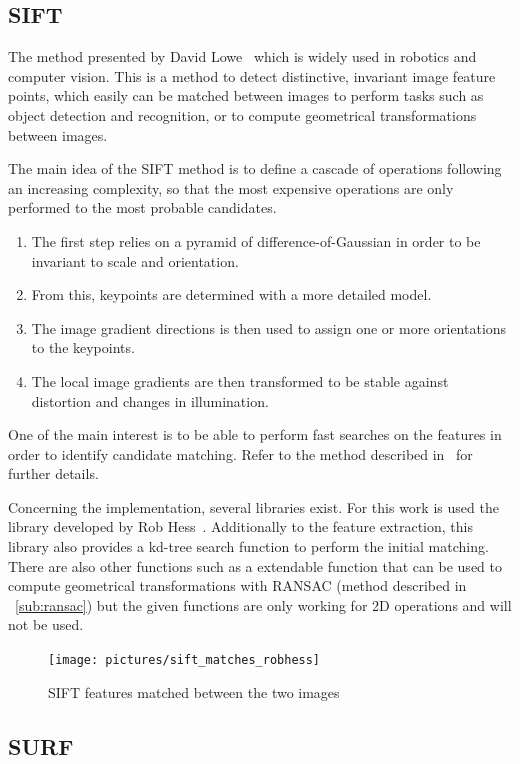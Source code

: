 \subsection{SIFT}

The method presented by David Lowe~\cite{lowe_2004_sift} which is widely used in robotics and computer vision.
This is a method to detect distinctive, invariant image feature points, which easily can be matched between images to perform tasks such as object detection and recognition, or to compute geometrical transformations between images.

The main idea of the SIFT method is to define a cascade of operations following an increasing complexity, so that the most expensive operations are only performed to the most probable candidates.
\begin{enumerate}
\item The first step relies on a pyramid of difference-of-Gaussian in order to be invariant to scale and orientation.
\item From this, keypoints are determined with a more detailed model.
\item The image gradient directions is then used to assign one or more orientations to the keypoints.
\item The local image gradients are then transformed to be stable against distortion and changes in illumination.
\end{enumerate}
One of the main interest is to be able to perform fast searches on the features in order to identify candidate matching. Refer to the method described in~\cite{lowe_2004_sift} for further details.

Concerning the implementation, several libraries exist. For this work is used the library developed by Rob Hess~\cite{hess_sift}. Additionally to the feature extraction, this library also provides a kd-tree search function to perform the initial matching. There are also other functions such as a extendable function that can be used to compute geometrical transformations with RANSAC (method described in ~\ref{sub:ransac}) but the given functions are only working for 2D operations and will not be used.

\begin{figure}[h!]
\centering
\texttt{[image: pictures/sift\_matches\_robhess]}
\caption{SIFT features matched between the two images}
\end{figure}

\subsection{SURF}

